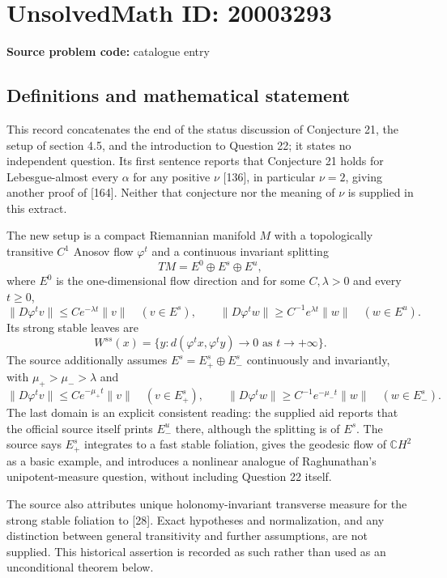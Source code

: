 \documentclass[11pt]{article}
\begin{document}
\section*{UnsolvedMath ID: 20003293}
\textbf{Source problem code:} catalogue entry
\subsection{Definitions and mathematical statement}
This record concatenates the end of the status discussion of Conjecture 21, the setup of section 4.5, and the introduction to Question 22; it states no independent question. Its first sentence reports that Conjecture 21 holds for Lebesgue-almost every $\alpha$ for any positive $\nu$ [136], in particular $\nu=2$, giving another proof of [164]. Neither that conjecture nor the meaning of $\nu$ is supplied in this extract.

The new setup is a compact Riemannian manifold $M$ with a topologically transitive $C^1$ Anosov flow $\varphi^t$ and a continuous invariant splitting
\[
 TM=E^0\oplus E^s\oplus E^u,
\]
where $E^0$ is the one-dimensional flow direction and for some $C,\lambda>0$ and every $t\ge0$,
\[
 \|D\varphi^t v\|\le Ce^{-\lambda t}\|v\|\quad(v\in E^s),\qquad
 \|D\varphi^t w\|\ge C^{-1}e^{\lambda t}\|w\|\quad(w\in E^u).
\]
Its strong stable leaves are
\[
 W^{ss}(x)=\{y:d(\varphi^t x,\varphi^t y)\to0\text{ as }t\to+\infty\}.
\]
The source additionally assumes $E^s=E^s_+\oplus E^s_-$ continuously and invariantly, with $\mu_+>\mu_->\lambda$ and
\[
 \|D\varphi^t v\|\le Ce^{-\mu_+t}\|v\|\quad(v\in E^s_+),\qquad
 \|D\varphi^t w\|\ge C^{-1}e^{-\mu_-t}\|w\|\quad(w\in E^s_-).
\]
The last domain is an explicit consistent reading: the supplied aid reports that the official source itself prints $E^u_-$ there, although the splitting is of $E^s$. The source says $E^s_+$ integrates to a fast stable foliation, gives the geodesic flow of $\mathbb C H^2$ as a basic example, and introduces a nonlinear analogue of Raghunathan's unipotent-measure question, without including Question 22 itself.

The source also attributes unique holonomy-invariant transverse measure for the strong stable foliation to [28]. Exact hypotheses and normalization, and any distinction between general transitivity and further assumptions, are not supplied. This historical assertion is recorded as such rather than used as an unconditional theorem below.
\end{document}
